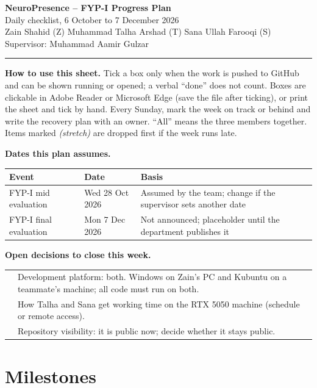 \documentclass[10pt,a4paper]{article}
\newcounter{cbn}
\newcommand{\cb}{\mbox{\stepcounter{cbn}\CheckBox[name=cb\thecbn,width=9pt,height=9pt,borderwidth=0.8pt,bordercolor=0 0 0,backgroundcolor=1 1 1,checkboxsymbol=\ding{51}]{}}}
\newcommand{\cbdone}{\mbox{\stepcounter{cbn}\CheckBox[name=cb\thecbn,checked=true,width=9pt,height=9pt,borderwidth=0.8pt,bordercolor=0 0 0,backgroundcolor=1 1 1,checkboxsymbol=\ding{51}]{}}}
\begin{document}
\begin{Form}

\begin{center}
{\LARGE\bfseries NeuroPresence -- FYP-I Progress Plan}\\[4pt]
Daily checklist, 6 October to 7 December 2026\\[2pt]
Zain Shahid (Z) \quad Muhammad Talha Arshad (T) \quad Sana Ullah Farooqi (S) \quad Supervisor: Muhammad Aamir Gulzar
\end{center}
\hrule\medskip

\textbf{How to use this sheet.}
Tick a box only when the work is pushed to GitHub and can be shown running or opened; a verbal ``done'' does not count.
Boxes are clickable in Adobe Reader or Microsoft Edge (save the file after ticking), or print the sheet and tick by hand.
Every Sunday, mark the week on track or behind and write the recovery plan with an owner.
``All'' means the three members together. Items marked \emph{(stretch)} are dropped first if the week runs late.

\textbf{Dates this plan assumes.}

\begin{tabular}{@{}p{50mm}p{34mm}p{80mm}@{}}
\toprule
Event & Date & Basis \\
\midrule
FYP-I mid evaluation & Wed 28 Oct 2026 & Assumed by the team; change if the supervisor sets another date \\
FYP-I final evaluation & Mon 7 Dec 2026 & Not announced; placeholder until the department publishes it \\
\bottomrule
\end{tabular}

\textbf{Open decisions to close this week.}

\begin{tabular}{@{}p{6mm}p{166mm}@{}}
\cbdone & Development platform: both. Windows on Zain's PC and Kubuntu on a teammate's machine; all code must run on both. \\
\cb & How Talha and Sana get working time on the RTX 5050 machine (schedule or remote access). \\
\cb & Repository visibility: it is public now; decide whether it stays public. \\
\end{tabular}

\section*{Milestones}


\end{Form}
\end{document}

